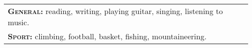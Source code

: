 \begin{tabular}{ll}

    \textsc{\textbf{General:}} reading, writing, playing guitar, singing, listening to music. \\
    \textsc{\textbf{Sport:}} climbing, football, basket, fishing, mountaineering. \\
\end{tabular}